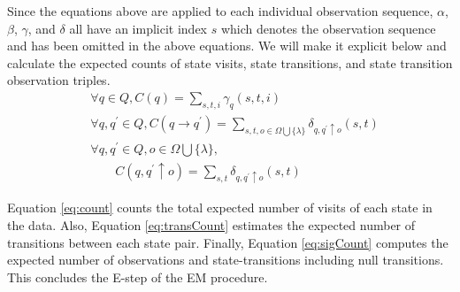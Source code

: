 \documentclass[letterpaper]{article}
\begin{document}
Since the equations above are applied to each individual observation sequence, $\alpha$, $\beta$, $\gamma$, and $\delta$ all have an implicit index $s$ which denotes the observation sequence and has been omitted in the above equations. We will make it explicit below and calculate the expected counts of state visits, state transitions, and state transition observation triples. 
{\footnotesize
\begin{align}
&\forall q \in Q, C(q) = \sum_{s,t,i} \gamma_q(s,t,i) \label{eq:count}\\
&\forall q, q^\prime \in Q, C(q \rightarrow q^\prime) = \sum_{s,t,o \in \Omega \bigcup \{\lambda\}} \delta_{q,q^\prime \uparrow o}(s,t) \label{eq:transCount}\\
&\forall q, q^\prime \in Q, o \in \Omega \bigcup \{\lambda\}, \label{eq:sigCount}\\
&\qquad C(q, q^\prime \uparrow o) = \sum_{s,t} \delta_{q,q^\prime \uparrow o}(s,t) \nonumber
\end{align}
\vspace{-.2in}
}%



Equation \ref{eq:count} counts the total expected number of visits of each state in the data. Also, Equation \ref{eq:transCount} estimates the expected number of transitions between each state pair. Finally, Equation \ref{eq:sigCount} computes the expected number of observations and state-transitions including null transitions. This concludes the E-step of the EM procedure. 

\end{document}
